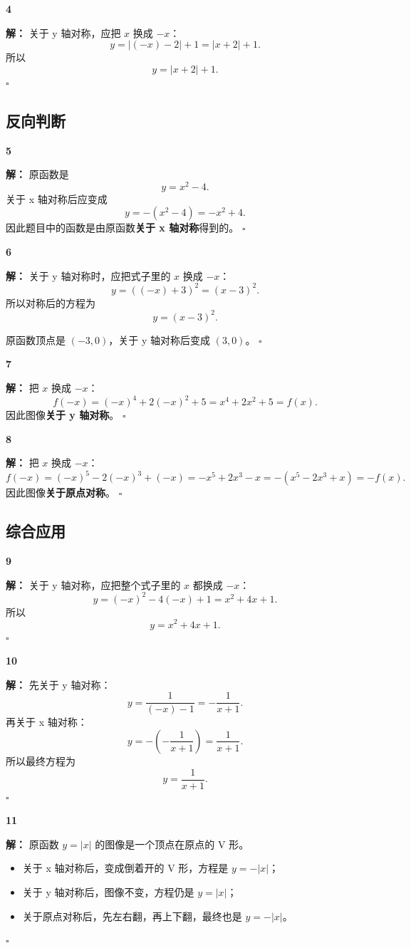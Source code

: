 \documentclass[11pt,a4paper,fontset=fandol]{ctexart}
\theoremstyle{formalexample}
\newenvironment{solution}{\par\noindent\textbf{解：}}{\hfill$\square$\par}
\begin{document}
\textbf{4}\begin{solution}
关于 y 轴对称，应把 $x$ 换成 $-x$：
\[
y=|(-x)-2|+1=|x+2|+1.
\]
所以
\[
\boxed{y=|x+2|+1}.
\]
\end{solution}

\subsection*{反向判断}

\textbf{5}\begin{solution}
原函数是
\[
y=x^2-4.
\]
关于 x 轴对称后应变成
\[
y=-(x^2-4)=-x^2+4.
\]
因此题目中的函数是由原函数\textbf{关于 x 轴对称}得到的。
\end{solution}

\textbf{6}\begin{solution}
关于 y 轴对称时，应把式子里的 $x$ 换成 $-x$：
\[
y=((-x)+3)^2=(x-3)^2.
\]
所以对称后的方程为
\[
\boxed{y=(x-3)^2}.
\]

原函数顶点是 $(-3,0)$，关于 y 轴对称后变成 $(3,0)$。
\end{solution}

\textbf{7}\begin{solution}
把 $x$ 换成 $-x$：
\[
f(-x)=(-x)^4+2(-x)^2+5=x^4+2x^2+5=f(x).
\]
因此图像\textbf{关于 y 轴对称}。
\end{solution}

\textbf{8}\begin{solution}
把 $x$ 换成 $-x$：
\[
f(-x)=(-x)^5-2(-x)^3+(-x)=-x^5+2x^3-x=-(x^5-2x^3+x)=-f(x).
\]
因此图像\textbf{关于原点对称}。
\end{solution}

\subsection*{综合应用}

\textbf{9}\begin{solution}
关于 y 轴对称，应把整个式子里的 $x$ 都换成 $-x$：
\[
y=(-x)^2-4(-x)+1=x^2+4x+1.
\]
所以
\[
\boxed{y=x^2+4x+1}.
\]
\end{solution}

\textbf{10}\begin{solution}
先关于 y 轴对称：
\[
y=\frac{1}{(-x)-1}=-\frac{1}{x+1}.
\]
再关于 x 轴对称：
\[
y=-\left(-\frac{1}{x+1}\right)=\frac{1}{x+1}.
\]
所以最终方程为
\[
\boxed{y=\frac{1}{x+1}}.
\]
\end{solution}

\textbf{11}\begin{solution}
原函数 $y=|x|$ 的图像是一个顶点在原点的 V 形。
\begin{itemize}
  \item 关于 x 轴对称后，变成倒着开的 V 形，方程是 $y=-|x|$；
  \item 关于 y 轴对称后，图像不变，方程仍是 $y=|x|$；
  \item 关于原点对称后，先左右翻，再上下翻，最终也是 $y=-|x|$。
\end{itemize}
\end{solution}
\end{document}
